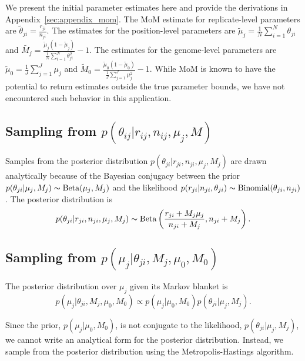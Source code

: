 \documentclass[11pt,reqno]{amsart}
\begin{document}
We present the initial parameter estimates here and provide the derivations in Appendix~\ref{sec:appendix_mom}. The MoM estimate for replicate-level parameters are 
$\tilde{\theta}_{ji} = \frac{r_{ji}} {n_{ji}}$. 
The estimates for the position-level parameters are 
$\tilde{\mu}_j = \frac{1}{N} \sum_{i=1}^N \theta_{ji}$ 
and 
$\tilde{M_j} = \frac{ \tilde{\mu}_j (1 - \tilde{\mu}_j ) } { \frac{1}{N} \sum_{i=1}^N \theta_{ji}^2 } -1$. 
The estimates for the genome-level parameters are 
$\tilde{\mu}_0 = \frac{1}{J} \sum_{j=1}^J \mu_j$ 
and 
$\tilde{M}_0 = \frac{ \tilde{\mu}_0 (1 - \tilde{\mu}_0 ) } {\frac{1}{J} \sum_{j=1}^J \mu_j^2 } -1$. 
While MoM is known to have the potential to return estimates outside the true parameter bounds, we have not encountered such behavior in this application. 

\subsection{Sampling from $p \left( \theta_{ij} |r_{ij},n_{ij},\mu_j,M \right)$}

Samples from the posterior distribution 
$p(\theta_{ji} | r_{ji}, n_{ji}, \mu_j, M_j)$ 
are drawn analytically because of the Bayesian conjugacy between the prior 
$p(\theta_{ji} | \mu_j, M_j) \thicksim \text{Beta}(\mu_j, M_j)$ 
and the likelihood 
$p(r_{ji} | n_{ji}, \theta_{ji}) \thicksim \text{Binomial}(\theta_{ji}, n_{ji})$. 
The posterior distribution is 
\begin{equation}
	p(\theta_{ji} | r_{ji}, n_{ji}, \mu_j, M_j) \thicksim \text{Beta}\left( \frac{r_{ji} + M_j \mu_j}{n_{ji} + M_j} , n_{ji} + M_j\right).
\end{equation}

\subsection{Sampling from $p \left( \mu_j |\theta_{ji},M_j,\mu_0,M_0\right)$}
The posterior distribution over $\mu_j$ given its Markov blanket is 
\begin{equation}
	p( \mu_j | \theta_{ji}, M_j, \mu_0, M_0 ) \propto p(\mu_j | \mu_0, M_0) p(\theta_{ji} | \mu_j, M_j).
\end{equation}

Since the prior, $p(\mu_j | \mu_0, M_0)$, is not conjugate to the likelihood, $p(\theta_{ji} | \mu_j, M_j)$, we cannot write an analytical form for the posterior distribution. Instead, we sample from the posterior distribution using the Metropolis-Hastings algorithm.
\end{document}

